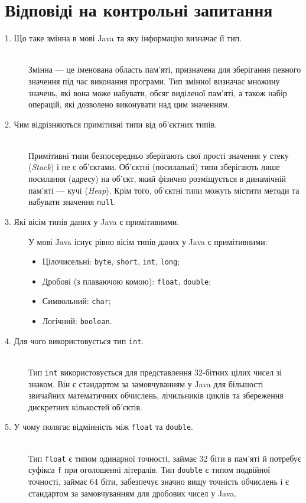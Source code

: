 \section{Відповіді на контрольні запитання}

\begin{description}
    \item[1. Що таке змінна в мові Java та яку інформацію визначає її тип.] ~\\
    Змінна — це іменована область пам'яті, призначена для зберігання певного значення під час виконання програми. Тип змінної визначає множину значень, які вона може набувати, обсяг виділеної пам'яті, а також набір операцій, які дозволено виконувати над цим значенням.

    \item[2. Чим відрізняються примітивні типи від об'єктних типів.] ~\\
    Примітивні типи безпосередньо зберігають свої прості значення у стеку (\textit{Stack}) і не є об'єктами. Об'єктні (посилальні) типи зберігають лише посилання (адресу) на об'єкт, який фізично розміщується в динамічній пам'яті — кучі (\textit{Heap}). Крім того, об'єктні типи можуть містити методи та набувати значення \texttt{null}.

    \item[3. Які вісім типів даних у Java є примітивними.]
    У мові Java існує рівно вісім типів даних у Java є примітивними:
    \begin{itemize}
        \item Цілочисельні: \texttt{byte}, \texttt{short}, \texttt{int}, \texttt{long};
        \item Дробові (з плаваючою комою): \texttt{float}, \texttt{double};
        \item Символьний: \texttt{char};
        \item Логічний: \texttt{boolean}.
    \end{itemize}

    \item[4. Для чого використовується тип \texttt{int}.] ~\\
    Тип \texttt{int} використовується для представлення 32-бітних цілих чисел зі знаком. Він є стандартом за замовчуванням у Java для більшості звичайних математичних обчислень, лічильників циклів та збереження дискретних кількостей об'єктів.

    \item[5. У чому полягає відмінність між \texttt{float} та \texttt{double}.] ~\\
    Тип \texttt{float} є типом одинарної точності, займає 32 біти в пам'яті й потребує суфікса \texttt{f} при оголошенні літералів. Тип \texttt{double} є типом подвійної точності, займає 64 біти, забезпечує значно вищу точність обчислень і є стандартом за замовчуванням для дробових чисел у Java.


\end{description}
